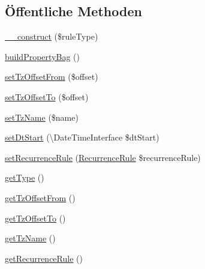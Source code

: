 \subsection*{Öffentliche Methoden}
\begin{DoxyCompactItemize}
\item 
\mbox{\hyperlink{class_eluceo_1_1i_cal_1_1_component_1_1_timezone_rule_af9ae541025f04809b70e8b2a31e0fa61}{\+\_\+\+\_\+construct}} (\$rule\+Type)
\item 
\mbox{\hyperlink{class_eluceo_1_1i_cal_1_1_component_1_1_timezone_rule_a35528a86b1fe5e3640d7964cfe46c201}{build\+Property\+Bag}} ()
\item 
\mbox{\hyperlink{class_eluceo_1_1i_cal_1_1_component_1_1_timezone_rule_adadbfa3ddbeda26f4e615eb07d467920}{set\+Tz\+Offset\+From}} (\$offset)
\item 
\mbox{\hyperlink{class_eluceo_1_1i_cal_1_1_component_1_1_timezone_rule_a7e32fa095725379eff54d1c66f9b1b69}{set\+Tz\+Offset\+To}} (\$offset)
\item 
\mbox{\hyperlink{class_eluceo_1_1i_cal_1_1_component_1_1_timezone_rule_ac8f0eac95662554ce52e247daf89952a}{set\+Tz\+Name}} (\$name)
\item 
\mbox{\hyperlink{class_eluceo_1_1i_cal_1_1_component_1_1_timezone_rule_a161d33d5128049a75e78280467ff9347}{set\+Dt\+Start}} (\textbackslash{}Date\+Time\+Interface \$dt\+Start)
\item 
\mbox{\hyperlink{class_eluceo_1_1i_cal_1_1_component_1_1_timezone_rule_aa74485780bd11e82c18720d6bba9b3b4}{set\+Recurrence\+Rule}} (\mbox{\hyperlink{class_eluceo_1_1i_cal_1_1_property_1_1_event_1_1_recurrence_rule}{Recurrence\+Rule}} \$recurrence\+Rule)
\item 
\mbox{\hyperlink{class_eluceo_1_1i_cal_1_1_component_1_1_timezone_rule_a8d7d4529c2b9d573d8dbe1ab86a3985e}{get\+Type}} ()
\item 
\mbox{\hyperlink{class_eluceo_1_1i_cal_1_1_component_1_1_timezone_rule_a808aa034effa5f37251fb844d2a6cd81}{get\+Tz\+Offset\+From}} ()
\item 
\mbox{\hyperlink{class_eluceo_1_1i_cal_1_1_component_1_1_timezone_rule_aafeda12e4329f3a87fd326546b184e3d}{get\+Tz\+Offset\+To}} ()
\item 
\mbox{\hyperlink{class_eluceo_1_1i_cal_1_1_component_1_1_timezone_rule_a2c832422bfc268aed12d7116ac65ca62}{get\+Tz\+Name}} ()
\item 
\mbox{\hyperlink{class_eluceo_1_1i_cal_1_1_component_1_1_timezone_rule_aa0a37d70f8cd2741dca701b150ecb4eb}{get\+Recurrence\+Rule}} ()
\item 

\end{DoxyCompactItemize}
